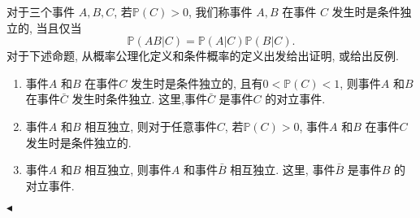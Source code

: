 \documentclass[11pt]{article}
\newenvironment{problem}[2][Problem]{\begin{trivlist}
\item[\hskip \labelsep {\bfseries #1}\hskip \labelsep {\bfseries #2.}]\songti}{\hfill$\blacktriangleleft$\end{trivlist}}
\newcommand\1{\mathds{1}}
\newcommand\PP{\mathbb{P}}
\begin{document}
\begin{problem}{2}
    \songti
    对于三个事件 $A, B, C$, 若$\PP(C) > 0$, 我们称事件 $A, B$ 在事件 $C$ 发生时是条件独立的, 当且仅当\[\PP(AB|C) = \PP(A|C)\PP(B|C).\]
    对于下述命题, 从概率公理化定义和条件概率的定义出发给出证明, 或给出反例.
    \begin{enumerate}[label=(\arabic*)]
        \item 事件$A$ 和$B$ 在事件$C$ 发生时是条件独立的, 且有$0 < \PP (C) < 1$, 则事件$A$ 和$B$ 在事件$\bar{C}$ 发生时条件独立. 这里,事件$\bar{C}$ 是事件$C$ 的对立事件. 
        \item 事件$A$ 和$B$ 相互独立, 则对于任意事件$C$, 若$\PP (C) > 0$, 事件$A$ 和$B$ 在事件$C$ 发生时是条件独立的. 
        \item 事件$A$ 和$B$ 相互独立, 则事件$A$ 和事件$\bar{B}$ 相互独立. 这里, 事件$\bar{B}$ 是事件$B$ 的对立事件. 
    \end{enumerate}
\end{problem}
\end{document}

